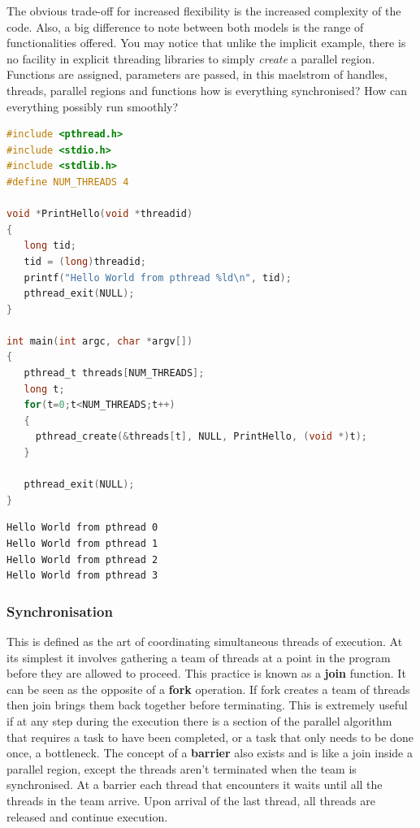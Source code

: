 \documentclass[11pt]{article} %
\begin{document}
The obvious trade-off for increased flexibility is the increased complexity of the code. Also, a big difference to note between both models is the range of functionalities offered. You may notice that unlike the implicit example, there is no facility in explicit threading libraries to simply {\it create} a parallel region. Functions are assigned, parameters are passed, in this maelstrom of handles, threads, parallel regions and functions how is everything synchronised? How can everything possibly run smoothly? 
\begin{lstlisting}[language=C, caption={Hello World from PThreads}]
#include <pthread.h>
#include <stdio.h>
#include <stdlib.h>
#define NUM_THREADS	4

void *PrintHello(void *threadid)
{
   long tid;
   tid = (long)threadid;
   printf("Hello World from pthread %ld\n", tid);
   pthread_exit(NULL);
}

int main(int argc, char *argv[])
{
   pthread_t threads[NUM_THREADS];
   long t;
   for(t=0;t<NUM_THREADS;t++)
   {
     pthread_create(&threads[t], NULL, PrintHello, (void *)t);
   }
   
   pthread_exit(NULL);
}
\end{lstlisting}
\begin{verbatim}
Hello World from pthread 0
Hello World from pthread 1
Hello World from pthread 2
Hello World from pthread 3
\end{verbatim}
\subsubsection{Synchronisation}
This is defined as the art of coordinating simultaneous threads of execution. At its simplest it involves gathering a team of threads at a point in the program before they are allowed to proceed. This practice is known as a {\bf join} function. It can be seen as the opposite of a {\bf fork} operation. If fork creates a team of threads then join brings them back together before terminating. This is extremely useful if at any step during the execution there is a section of the parallel algorithm that requires a task to have been completed, or a task that only needs to be done once, a bottleneck. The concept of a {\bf barrier} also exists and is like a join inside a parallel region, except the threads aren't terminated when the team is synchronised. At a barrier each thread that encounters it waits until all the threads in the team arrive. Upon arrival of the last thread, all threads are released and continue execution. \cite[p265]{ref14}
\end{document}
